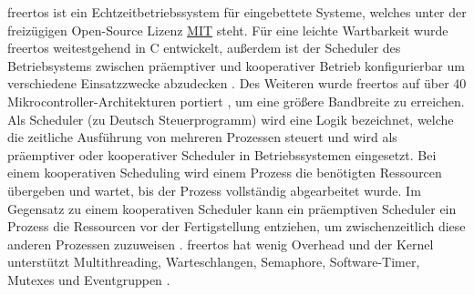 \documentclass[../EDF Master Thesis.tex]{subfiles}
\begin{document}
    \ac{freertos} ist ein Echtzeitbetriebssystem für eingebettete Systeme, welches unter der freizügigen Open-Source Lizenz \href{https://de.wikipedia.org/wiki/MIT-Lizenz}{MIT} steht.
    Für eine leichte Wartbarkeit wurde \ac{freertos} weitestgehend in C entwickelt, außerdem ist der Scheduler des Betriebsystems zwischen präemptiver und kooperativer Betrieb konfigurierbar um verschiedene Einsatzzwecke abzudecken \parencite{wiki:002}.
    Des Weiteren wurde \ac{freertos} auf über 40 Mikrocontroller-Architekturen portiert \parencite{freertos}, um eine größere Bandbreite zu erreichen.
    Als Scheduler (zu Deutsch Steuerprogramm) wird eine Logik bezeichnet, welche die zeitliche Ausführung von mehreren Prozessen steuert und wird als präemptiver oder kooperativer Scheduler in Betriebssystemen eingesetzt.
    Bei einem kooperativen Scheduling wird einem Prozess die benötigten Ressourcen übergeben und wartet, bis der Prozess vollständig abgearbeitet wurde.
    Im Gegensatz zu einem kooperativen Scheduler kann ein präemptiven Scheduler ein Prozess die Ressourcen vor der Fertigstellung entziehen, um zwischenzeitlich diese anderen Prozessen zuzuweisen \parencite{wiki:003}.
    \ac{freertos} hat wenig Overhead und der Kernel unterstützt Multithreading, Warteschlangen, Semaphore, Software-Timer, Mutexes und Eventgruppen \parencite{freertos-features}.
\end{document}
